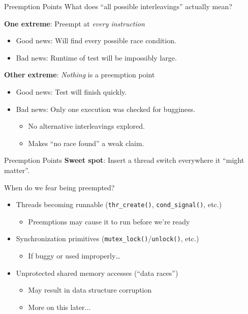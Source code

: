 \documentclass[xcolor=dvipsnames]{beamer}
\begin{document}
\begin{frame}{Preemption Points}
	What does ``all possible interleavings'' actually mean?

	\linegap
	{\bf One extreme}: Preempt at {\em every instruction}
	\begin{itemize}
		\item Good news: Will find every possible race condition.
		\item Bad news: Runtime of test will be impossibly large.
	\end{itemize}
	\linegap

	{\bf Other extreme}: {\em Nothing} is a preemption point
	\begin{itemize}
		\item Good news: Test will finish quickly.
		\item Bad news: Only one execution was checked for bugginess.
		\begin{itemize}
			\item No alternative interleavings explored.
			\item Makes ``no race found'' a weak claim.
		\end{itemize}
	\end{itemize}
\end{frame}


\begin{frame}{Preemption Points}
	\textbf{Sweet spot}: Insert a thread switch everywhere it ``might matter''.

	\linegap
	When do we fear being preempted?
	\begin{itemize}
		\item Threads becoming runnable (\texttt{thr\_create()}, \texttt{cond\_signal()}, etc.)
			\begin{itemize}
				\item Preemptions may cause it to run before we're ready
			\end{itemize}
		\item Synchronization primitives (\texttt{mutex\_lock()}/\texttt{unlock()}, etc.)
			\begin{itemize}
				\item If buggy or used improperly\ldots
			\end{itemize}
		\item Unprotected shared memory accesses (``data races'')%
			\begin{itemize}
				\item May result in data structure corruption
				\item More on this later...
			\end{itemize}
	\end{itemize}

\end{frame}
\end{document}
